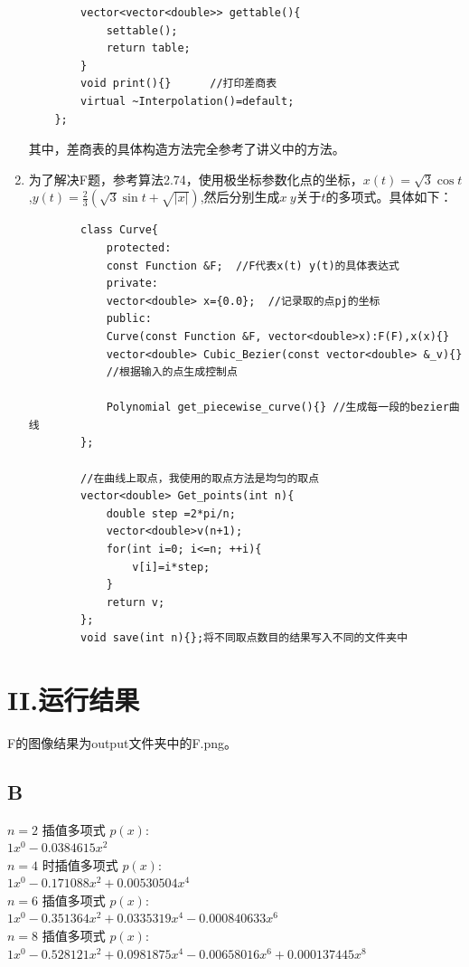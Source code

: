 \documentclass[a4paper]{article}
\begin{document}
\begin{enumerate}
\begin{lstlisting}
		vector<vector<double>> gettable(){
			settable();
			return table;
		}
		void print(){}    	//打印差商表
		virtual ~Interpolation()=default; 
	};
\end{lstlisting}
	其中，差商表的具体构造方法完全参考了讲义中的方法。
	\item 
	为了解决F题，参考算法2.74，使用极坐标参数化点的坐标，$x(t)=\sqrt{3}\cos t$,$y(t)=\frac{2}{3}(\sqrt{3}\sin t +\sqrt{|x|})$,然后分别生成$x\: y$关于$t$的多项式。具体如下：
	\begin{lstlisting}
		class Curve{
			protected:
			const Function &F;  //F代表x(t) y(t)的具体表达式
			private:
			vector<double> x={0.0};  //记录取的点pj的坐标
			public:
			Curve(const Function &F, vector<double>x):F(F),x(x){}
			vector<double> Cubic_Bezier(const vector<double> &_v){} 
			//根据输入的点生成控制点
			
			Polynomial get_piecewise_curve(){} //生成每一段的bezier曲线
		};
		
		//在曲线上取点，我使用的取点方法是均匀的取点
		vector<double> Get_points(int n){
			double step =2*pi/n;
			vector<double>v(n+1);
			for(int i=0; i<=n; ++i){
				v[i]=i*step;
			}
			return v;
		};
		void save(int n){};将不同取点数目的结果写入不同的文件夹中
	\end{lstlisting}
\end{enumerate}
\section*{II.运行结果}
F的图像结果为output文件夹中的F.png。
\subsection*{B}
\begin{tcolorbox}[colback=gray!10, colframe=gray!80!black]
	\( n=2 \) 插值多项式 \( p(x) \): \\
	\( 1x^0 - 0.0384615x^2 \) \\
	\( n=4 \) 时插值多项式 \( p(x) \): \\
	\( 1x^0 - 0.171088x^2 + 0.00530504x^4 \) \\
	\( n=6 \) 插值多项式 \( p(x) \): \\
	\( 1x^0 - 0.351364x^2 + 0.0335319x^4 - 0.000840633x^6 \) \\
	\( n=8 \) 插值多项式 \( p(x) \): \\
	\( 1x^0 - 0.528121x^2 + 0.0981875x^4 - 0.00658016x^6 + 0.000137445x^8 \) \\
\end{tcolorbox}
\end{document}
